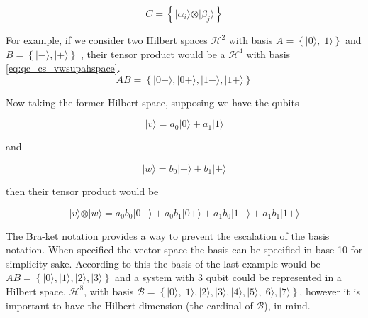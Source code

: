 \begin{equation} 
\label{eq:qc_cs_vwspace} 
C =\left\{  \vert \alpha_{i} \rangle \otimes \vert \beta_{j} \rangle \right\}
\end{equation}

For example, if we consider two Hilbert spaces $\mathcal{H}^2$ with basis
$ A=\left\{ \vert 0 \rangle , \vert 1 \rangle \right\}$ and 
$B =\left\{ \vert - \rangle, \vert + \rangle \right\}$
, their tensor product would be a $\mathcal{H}^4$ with basis \eqref{eq:qc_cs_vwsupahspace}.
\begin{equation}
\label{eq:qc_cs_vwsupahspace}
AB = \left\{ \vert 0  - \rangle, \vert 0 + \rangle, \vert 1 - \rangle,  \vert 1 + \rangle \right\}
\end{equation}

Now taking the former Hilbert space, supposing we have the qubits  

\begin{equation}
\label{eq:qc_cs_vqubit}
\vert v \rangle = a_{0}\vert 0\rangle + a_{1}\vert 1 \rangle
\end{equation}

and

\begin{equation}
\label{eq:qc_cs_wqubit}
\vert w \rangle = b_{0}\vert -\rangle + b_{1}\vert + \rangle
\end{equation}

then their tensor product would be

\begin{equation}
\label{eq:qc_cs_vwsupahspace2}
\vert v \rangle \otimes \vert w \rangle = a_{0}b_{0}\vert 0  - \rangle + a_{0}b_{1}\vert 0 + \rangle + a_{1}b_{0}\vert 1 - \rangle +  a_{1}b_{1}\vert 1 + \rangle 
\end{equation}


The Bra-ket notation provides a way to prevent the escalation of the basis notation. When specified the vector space the basis can be specified in base 10 for simplicity sake. According to this the basis of the last example would be $AB = \left\{ \vert 0 \rangle, \vert 1 \rangle, \vert 2 \rangle,  \vert 3 \rangle \right\}$ and a system with $3$ qubit could be represented in a Hilbert space, $\mathcal{H}^{8}$, with basis $\mathcal{B}= \left\{ \vert 0 \rangle, \vert 1 \rangle, \vert 2 \rangle,  \vert 3 \rangle,  \vert 4 \rangle,  \vert 5 \rangle,  \vert 6 \rangle,  \vert 7 \rangle \right\}$, however it is important to have the Hilbert dimension (the cardinal of $\mathcal{B}$), in mind.

